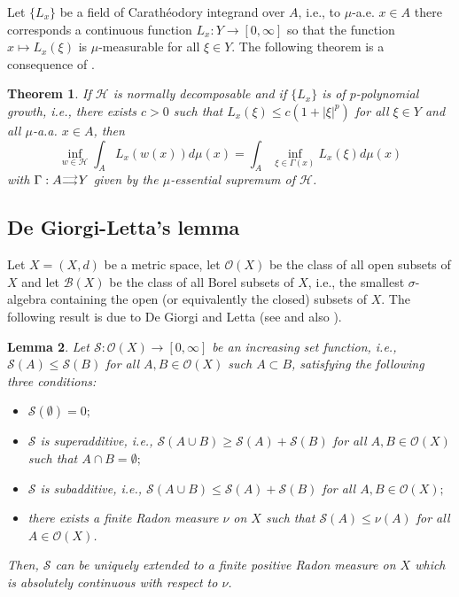 \documentclass[10pt]{amsart}
\numberwithin{equation}{section}
\newtheorem{theorem}{Theorem}[section]
\newtheorem{lemma}[theorem]{Lemma}
\theoremstyle{definition}
\theoremstyle{remark}
\begin{document}
Let $\{L_x\}$ be a field of Carath\'eodory integrand over $A$, i.e., to $\mu$-a.e. $x\in A$ there corresponds a continuous function $L_x:Y\to[0,\infty]$ so that the function $x\mapsto L_x(\xi)$ is $\mu$-measurable for all $\xi\in Y$. The following theorem is a consequence of \cite[Theorem 1.1]{oah-jpm03}.

\begin{theorem}\label{Interchange-Theorem}
If $\mathcal{H}$ is normally decomposable and if $\{L_x\}$ is of $p$-polynomial growth, i.e., there exists $c>0$ such that $L_x(\xi)\leq c(1+|\xi|^p)$ for all $\xi\in Y$ and all $\mu$-a.a. $x\in A$, then
$$
\inf_{w\in\mathcal{H}}\int_A L_x(w(x))d\mu(x)=\int_A\inf_{\xi\in\Gamma(x)}L_x(\xi)d\mu(x)
$$
with $\Gamma:A{{\scriptstyle\buildrel{\scriptstyle\longrightarrow}
\over{{}_{\scriptstyle\longrightarrow}}}} Y$ given by the  $\mu$-essential supremum of $\mathcal{H}$.
\end{theorem}

\subsection{De Giorgi-Letta's lemma}

Let $X=(X,d)$ be a metric space, let $\mathcal{O}(X)$ be the class of all open subsets of $X$ and let $\mathcal{B}(X)$ be the class of all Borel subsets of $X$, i.e., the smallest $\sigma$-algebra containing the open (or equivalently the closed) subsets of $X$. The following result is due to De Giorgi and Letta (see \cite{degiorgi-letta77} and also \cite[Lemma 3.3.6 p. 105]{buttazzo89}).

\begin{lemma}\label{DeGiorgi-Letta-Lemma}
Let $\mathcal{S}:\mathcal{O}(X)\to[0,\infty]$ be an increasing set function, i.e., $\mathcal{S}(A)\leq \mathcal{S}(B)$ for all $A,B\in\mathcal{O}(X)$ such $A\subset B$, satisfying the following three conditions{\rm:}
\begin{itemize}
\item[{\rm(i)}] $\mathcal{S}(\emptyset)=0;$
\item[{\rm(ii)}] $\mathcal{S}$ is superadditive, i.e., $\mathcal{S}(A\cup B)\geq \mathcal{S}(A)+\mathcal{S}(B)$ for all $A,B\in\mathcal{O}(X)$ such that $A\cap B=\emptyset;$
\item[{\rm(iii)}] $\mathcal{S}$ is subadditive, i.e., $\mathcal{S}(A\cup B)\leq \mathcal{S}(A)+\mathcal{S}(B)$ for all $A,B\in\mathcal{O}(X);$
\item[{\rm(iv)}] there exists a finite Radon measure $\nu$ on $X$ such that $\mathcal{S}(A)\leq\nu(A)$ for all $A\in\mathcal{O}(X)$.
\end{itemize}
Then, $\mathcal{S}$ can be uniquely extended to a finite positive Radon measure on $X$ which is absolutely continuous with respect to $\nu$.
\end{lemma}
\end{document}
